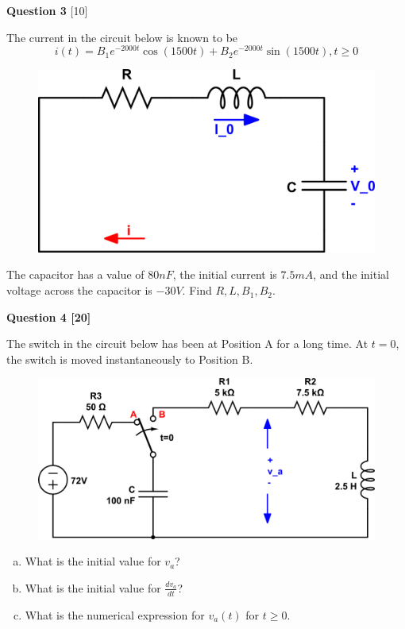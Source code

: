 \documentclass[12pt]{article}
\begin{document}
\newpage

{\bf Question 3} [10] %

The current in the circuit below is known to be
\begin{equation}
i(t) = B_1 e^{-2000t} \cos{(1500t)} + B_2 e^{-2000t} \sin{(1500t)}, t \geq 0 
\end{equation}
\begin{figure}[h!]
\begin{center}
 \includegraphics[scale=0.4]{fig8_3.png}
\end{center}
\end{figure}

The capacitor has a value of $80 nF$, the initial current is $7.5mA$, and the initial voltage across the capacitor is $-30V$. Find $R, L, B_1, B_2$.

\vspace{0.5cm}

{\bf Question 4 [20]} %

The switch in the circuit below has been at Position A for a long time. At $ t = 0$, the switch is moved instantaneously to Position B. 

\begin{figure}[h!]
\begin{center}
 \includegraphics[scale=0.6]{fig8_46.png}
\end{center}
\end{figure}

\begin{enumerate}[(a)]
\item What is the initial value for $v_a$?
\item What is the initial value for $\frac{dv_a}{dt}$?
\item What is the numerical expression for $v_a(t)$ for $t \geq 0$.
\end{enumerate}
\end{document}
